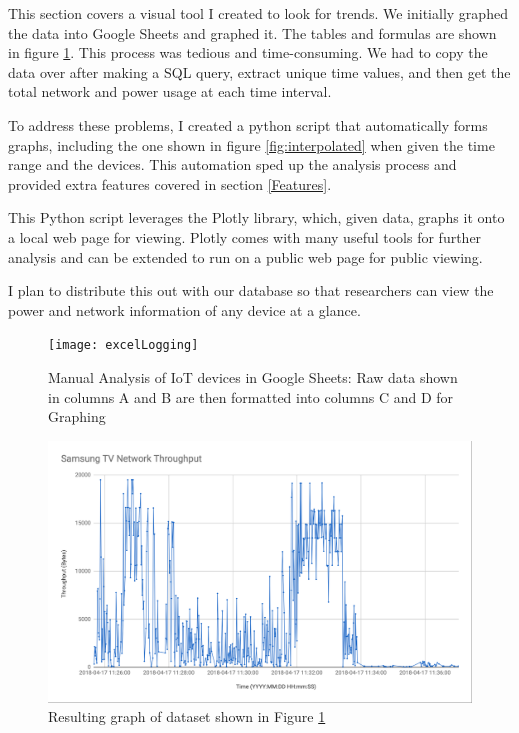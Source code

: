 This section covers a visual tool I created to look for trends. We initially graphed the data into Google Sheets and graphed it. The tables and formulas are shown in figure \ref{fig:excelLogging}. This process was tedious and time-consuming. We had to copy the data over after making a SQL query, extract unique time values, and then get the total network and power usage at each time interval.

To address these problems, I created a python script that automatically forms graphs, including the one shown in figure \ref{fig:interpolated} when given the time range and the devices. This automation sped up the analysis process and provided extra features covered in section \ref{Features}.

This Python script leverages the Plotly library, which, given data, graphs it onto a local web page for viewing. Plotly comes with many useful tools for further analysis and can be extended to run on a public web page for public viewing.

I plan to distribute this out with our database so that researchers can view the power and network information of any device at a glance.

\begin{figure}[H]
    \centering
    \texttt{[image: excelLogging]}
    \caption{Manual Analysis of IoT devices in Google Sheets: Raw data shown in columns A and B are then formatted into columns C and D for Graphing}
    \label{fig:excelLogging}
\end{figure}

\begin{figure}[H]
    \centering
    \includegraphics[width=1\textwidth]{figures/tvThroughput.png}
    \caption{Resulting graph of dataset shown in Figure \ref{fig:excelLogging}}
    \label{fig:tvThroughput}
\end{figure}

